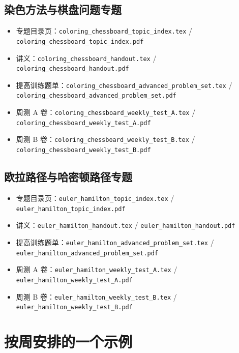 \documentclass[11pt,a4paper,fontset=fandol]{ctexart}
\begin{document}
\subsection{染色方法与棋盘问题专题}
\begin{itemize}
  \item 专题目录页：\texttt{coloring\_chessboard\_topic\_index.tex} / \texttt{coloring\_chessboard\_topic\_index.pdf}
  \item 讲义：\texttt{coloring\_chessboard\_handout.tex} / \texttt{coloring\_chessboard\_handout.pdf}
  \item 提高训练题单：\texttt{coloring\_chessboard\_advanced\_problem\_set.tex} / \texttt{coloring\_chessboard\_advanced\_problem\_set.pdf}
  \item 周测 A 卷：\texttt{coloring\_chessboard\_weekly\_test\_A.tex} / \texttt{coloring\_chessboard\_weekly\_test\_A.pdf}
  \item 周测 B 卷：\texttt{coloring\_chessboard\_weekly\_test\_B.tex} / \texttt{coloring\_chessboard\_weekly\_test\_B.pdf}
\end{itemize}

\subsection{欧拉路径与哈密顿路径专题}
\begin{itemize}
  \item 专题目录页：\texttt{euler\_hamilton\_topic\_index.tex} / \texttt{euler\_hamilton\_topic\_index.pdf}
  \item 讲义：\texttt{euler\_hamilton\_handout.tex} / \texttt{euler\_hamilton\_handout.pdf}
  \item 提高训练题单：\texttt{euler\_hamilton\_advanced\_problem\_set.tex} / \texttt{euler\_hamilton\_advanced\_problem\_set.pdf}
  \item 周测 A 卷：\texttt{euler\_hamilton\_weekly\_test\_A.tex} / \texttt{euler\_hamilton\_weekly\_test\_A.pdf}
  \item 周测 B 卷：\texttt{euler\_hamilton\_weekly\_test\_B.tex} / \texttt{euler\_hamilton\_weekly\_test\_B.pdf}
\end{itemize}

\section{按周安排的一个示例}
\end{document}
